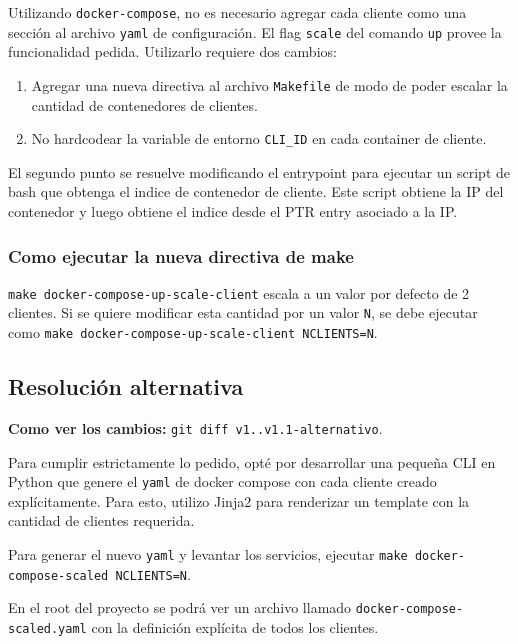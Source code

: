 \documentclass{article}
\begin{document}
Utilizando \texttt{docker-compose}, no es necesario agregar cada cliente como una sección al archivo \texttt{yaml} de configuración. El flag \texttt{\-\-scale} del comando \texttt{up}\cite{DockerComposeUp} provee la funcionalidad pedida. Utilizarlo requiere dos cambios:

\begin{enumerate}
	\item Agregar una nueva directiva al archivo \texttt{Makefile} de modo de poder escalar la cantidad de contenedores de clientes.
	\item No hardcodear la variable de entorno \texttt{CLI\_ID} en cada container de cliente.
\end{enumerate}

El segundo punto se resuelve modificando el entrypoint para ejecutar un script de bash que obtenga el indice de contenedor de cliente.\cite{IndexContainer} Este script obtiene la IP del contenedor y luego obtiene el indice desde el PTR entry asociado a la IP.

\subsubsection{Como ejecutar la nueva directiva de make}
\texttt{make docker-compose-up-scale-client} escala a un valor por defecto de 2 clientes. Si se quiere modificar esta cantidad por un valor \texttt{N}, se debe ejecutar como \texttt{make docker-compose-up-scale-client NCLIENTS=N}. \cite{MakefileOverridingVariables}

\subsection{Resolución alternativa}

\textbf{Como ver los cambios: }\texttt{git diff v1..v1.1-alternativo}.

Para cumplir estrictamente lo pedido, opté por desarrollar una pequeña CLI en Python que genere el \texttt{yaml} de docker compose con cada cliente creado explícitamente. Para esto, utilizo Jinja2\cite{Jinja} para renderizar un template con la cantidad de clientes requerida.

Para generar el nuevo \texttt{yaml} y levantar los servicios, ejecutar \texttt{make docker-compose-scaled NCLIENTS=N}.

En el root del proyecto se podrá ver un archivo llamado \texttt{docker-compose-scaled.yaml} con la definición explícita de todos los clientes.
\end{document}
